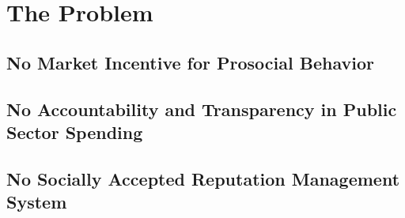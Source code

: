 \section{\textbf{The Problem}}

\subsection{No Market Incentive for Prosocial Behavior}

\subsection{No Accountability and Transparency in Public Sector Spending}

\subsection{No Socially Accepted Reputation Management System}

\newpage
\newpage

